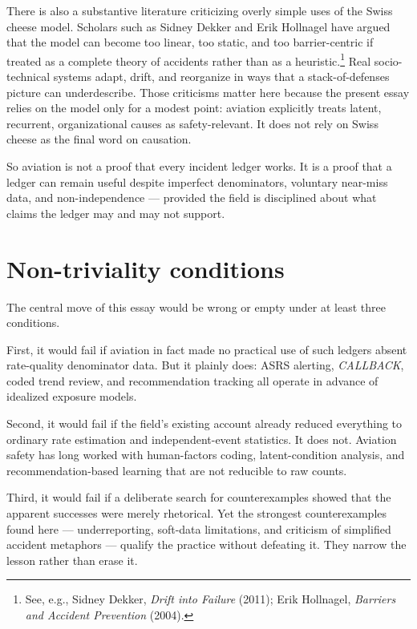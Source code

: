 \documentclass[11pt]{article}
\begin{document}
There is also a substantive literature criticizing overly simple uses of the Swiss cheese model. Scholars such as Sidney Dekker and Erik Hollnagel have argued that the model can become too linear, too static, and too barrier-centric if treated as a complete theory of accidents rather than as a heuristic.\footnote{See, e.g., Sidney Dekker, \textit{Drift into Failure} (2011); Erik Hollnagel, \textit{Barriers and Accident Prevention} (2004).} Real socio-technical systems adapt, drift, and reorganize in ways that a stack-of-defenses picture can underdescribe. Those criticisms matter here because the present essay relies on the model only for a modest point: aviation explicitly treats latent, recurrent, organizational causes as safety-relevant. It does not rely on Swiss cheese as the final word on causation.

So aviation is not a proof that every incident ledger works. It is a proof that a ledger can remain useful despite imperfect denominators, voluntary near-miss data, and non-independence --- provided the field is disciplined about what claims the ledger may and may not support.

\section{Non-triviality conditions}
The central move of this essay would be wrong or empty under at least three conditions.

First, it would fail if aviation in fact made no practical use of such ledgers absent rate-quality denominator data. But it plainly does: ASRS alerting, \textit{CALLBACK}, coded trend review, and recommendation tracking all operate in advance of idealized exposure models.

Second, it would fail if the field's existing account already reduced everything to ordinary rate estimation and independent-event statistics. It does not. Aviation safety has long worked with human-factors coding, latent-condition analysis, and recommendation-based learning that are not reducible to raw counts.

Third, it would fail if a deliberate search for counterexamples showed that the apparent successes were merely rhetorical. Yet the strongest counterexamples found here --- underreporting, soft-data limitations, and criticism of simplified accident metaphors --- qualify the practice without defeating it. They narrow the lesson rather than erase it.
\end{document}
